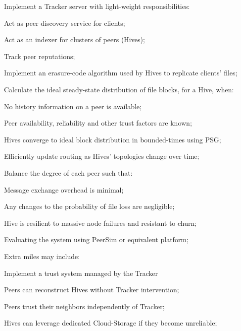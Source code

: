 \documentclass[runningheads]{llncs}
\newcommand{\SubItem}[1]{{\setlength\itemindent{15pt} \item[-] #1}}
\begin{document}
\begin{itemize}
    \item Implement a Tracker server with light-weight responsibilities:
        \SubItem{Act as peer discovery service for clients;}
        \SubItem{Act as an indexer for clusters of peers (Hives);}
        \SubItem{Track peer reputations;}
    \item Implement an erasure-code algorithm used by Hives to replicate clients' files;
    \item Calculate the ideal steady-state distribution of file blocks, for a Hive, when:
        \SubItem{No history information on a peer is available;}
        \SubItem{Peer availability, reliability and other trust factors are known;}
    \item Hives converge to ideal block distribution in bounded-times using PSG;
    \item Efficiently update routing as Hives' topologies change over time;
    \item Balance the degree of each peer such that:
        \SubItem{Message exchange overhead is minimal;}
        \SubItem{Any changes to the probability of file loss are negligible;}
        \SubItem{Hive is resilient to massive node failures and resistant to churn;}
    \item Evaluating the system using PeerSim \cite{peersim} or equivalent platform;
    \item Extra miles may include:
        \SubItem{Implement a trust system managed by the Tracker}
        \SubItem{Peers can reconstruct Hives without Tracker intervention;}
        \SubItem{Peers trust their neighbors independently of Tracker;}
        \SubItem{Hives can leverage dedicated Cloud-Storage if they become unreliable;}
\end{itemize}
\end{document}
